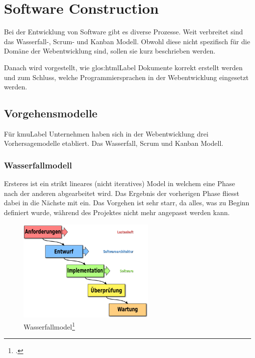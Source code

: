 \chapter{Software Construction}

Bei der Entwicklung von Software gibt es diverse Prozesse. Weit verbreitet sind das Wasserfall-, Scrum- und Kanban Modell. Obwohl diese nicht spezifisch für die Domäne der Webentwicklung sind, sollen sie kurz beschrieben werden.

Danach wird vorgestellt, wie \Gls{glos:htmlLabel} Dokumente korrekt erstellt werden und zum Schluss, welche Programmiersprachen in der Webentwicklung eingesetzt werden.

\section{Vorgehensmodelle}
Für \gls{kmuLabel} Unternehmen haben sich in der Webentwicklung drei Vorhersagemodelle etabliert. Das Wasserfall, Scrum und Kanban Modell. 

\subsection{Wasserfallmodell}
Ersteres ist ein strikt lineares (nicht iteratives) Model in welchem eine Phase nach der anderen abgearbeitet wird. Das Ergebnis der vorherigen Phase fliesst dabei in die Nächste mit ein. Das Vorgehen ist sehr starr, da alles, was zu Beginn definiert wurde, während des Projektes nicht mehr angepasst werden kann.

\begin{figure}[H]
  \centering
  \includegraphics[width=0.6\textwidth]{images/wasserfall.png}
  \caption{Wasserfallmodel\footcite{Waterfall_model-de_-_Wasserfallmodell__Wikipedia_2015-06-03}}
  \label{fig:softwareconstruction:vorgehensmodelle:wasserfall}
\end{figure}

